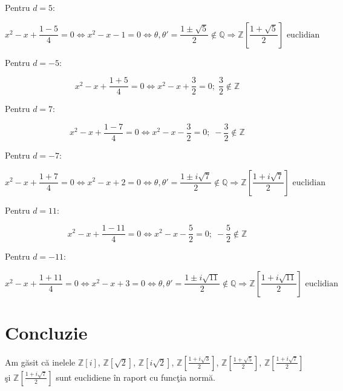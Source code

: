 \documentclass[12pt]{article}
\begin{document}
Pentru $d = 5$:

\begin{equation}
    x^2 - x + \frac{1 - 5}{4} = 0
    \Leftrightarrow x^2 - x - 1 = 0
    \Leftrightarrow \theta, \theta' = \frac{1 \pm \sqrt{5}}{2} \notin \mathbb{Q}
    \Rightarrow \boxed{\mathbb{Z}\left[\frac{1 + \sqrt{5}}{2}\right] \text{ euclidian}}
\end{equation}

Pentru $d = -5$:

\begin{equation*}
    x^2 - x + \frac{1 + 5}{4} = 0
    \Leftrightarrow x^2 - x + \frac{3}{2} = 0; \; \frac{3}{2} \notin \mathbb{Z}
\end{equation*}

Pentru $d = 7$:

\begin{equation*}
    x^2 - x + \frac{1 - 7}{4} = 0
    \Leftrightarrow x^2 - x - \frac{3}{2} = 0; \; -\frac{3}{2} \notin \mathbb{Z}
\end{equation*}

Pentru $d = -7$:

\begin{equation}
    x^2 - x + \frac{1 + 7}{4} = 0
    \Leftrightarrow x^2 - x + 2 = 0
    \Leftrightarrow \theta, \theta' = \frac{1 \pm i\sqrt{7}}{2} \notin \mathbb{Q}
    \Rightarrow \boxed{\mathbb{Z}\left[\frac{1 + i\sqrt{7}}{2}\right] \text{ euclidian}}
\end{equation}

Pentru $d = 11$:

\begin{equation*}
    x^2 - x + \frac{1 - 11}{4} = 0
    \Leftrightarrow x^2 - x - \frac{5}{2} = 0; \; -\frac{5}{2} \notin \mathbb{Z}
\end{equation*}

Pentru $d = -11$:

\begin{equation}
    x^2 - x + \frac{1 + 11}{4} = 0
    \Leftrightarrow x^2 - x + 3 = 0
    \Leftrightarrow \theta, \theta' = \frac{1 \pm i\sqrt{11}}{2} \notin \mathbb{Q}
    \Rightarrow \boxed{\mathbb{Z}\left[\frac{1 + i\sqrt{11}}{2}\right] \text{ euclidian}}
\end{equation}

\section*{Concluzie}
Am găsit că inelele
$\mathbb{Z}[i]$,
$\mathbb{Z}[\sqrt{2}]$,
$\mathbb{Z}[i\sqrt{2}]$,
$\mathbb{Z}\left[\frac{1 + i\sqrt{3}}{2}\right]$,
$\mathbb{Z}\left[\frac{1 + \sqrt{5}}{2}\right]$,
$\mathbb{Z}\left[\frac{1 + i\sqrt{7}}{2}\right]$ şi
$\mathbb{Z}\left[\frac{1 + i\sqrt{7}}{2}\right]$
sunt euclidiene în raport cu funcţia normă.
\end{document}
